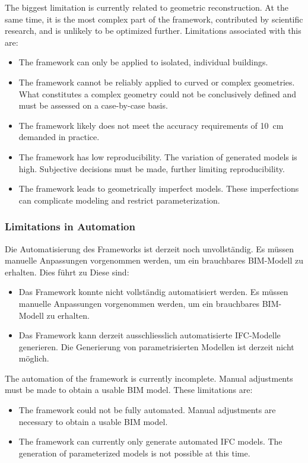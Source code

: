 \begin{English}
    The biggest limitation is currently related to geometric reconstruction. At the same time, it is the most complex part of the framework, contributed by scientific research, and is unlikely to be optimized further. Limitations associated with this are:

    \begin{itemize}
        \item The framework can only be applied to isolated, individual buildings.
        \item The framework cannot be reliably applied to curved or complex geometries. What constitutes a complex geometry could not be conclusively defined and must be assessed on a case-by-case basis.
        \item The framework likely does not meet the accuracy requirements of 10~cm demanded in practice.
        \item The framework has low reproducibility. The variation of generated models is high. Subjective decisions must be made, further limiting reproducibility.
        \item The framework leads to geometrically imperfect models. These imperfections can complicate modeling and restrict parameterization.
    \end{itemize}
\end{English}

\subsubsection{Limitations in Automation}
\begin{German}
    Die Automatisierung des Frameworks ist derzeit noch unvollständig. Es müssen manuelle Anpassungen vorgenommen werden, um ein brauchbares BIM-Modell zu erhalten. Dies führt zu Diese sind:

    \begin{itemize}
        \item Das Framework konnte nicht vollständig automatisiert werden. Es müssen manuelle Anpassungen vorgenommen werden, um ein brauchbares BIM-Modell zu erhalten.
        \item Das Framework kann derzeit ausschliesslich automatisierte IFC-Modelle generieren. Die Generierung von parametrisierten Modellen ist derzeit nicht möglich.
    \end{itemize}
\end{German}

\begin{English}
    The automation of the framework is currently incomplete. Manual adjustments must be made to obtain a usable BIM model. These limitations are:

    \begin{itemize}
        \item The framework could not be fully automated. Manual adjustments are necessary to obtain a usable BIM model.
        \item The framework can currently only generate automated IFC models. The generation of parameterized models is not possible at this time.
    \end{itemize}
\end{English}

